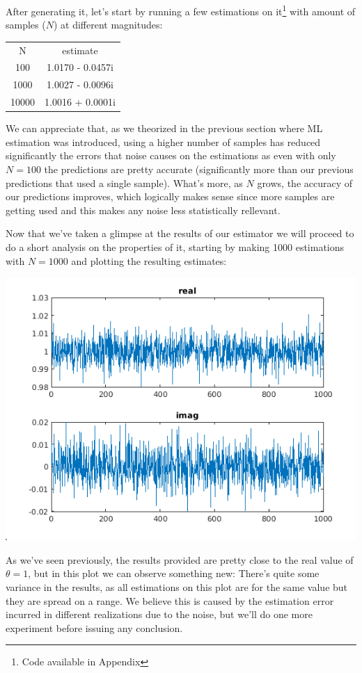 \documentclass[conference,9pt]{IEEEtran}
\begin{document}
After generating it, let's start by running a few estimations on it\footnote{Code available in Appendix} with amount of samples ($N$) at different magnitudes:

\begin{center}
    \begin{tabular}{ c c }
    N & estimate  \\ 
    100 & 1.0170 - 0.0457i  \\  
    1000 & 1.0027 - 0.0096i  \\  
    10000 & 1.0016 + 0.0001i
    \end{tabular}
\end{center}

We can appreciate that, as we theorized in the previous section where ML estimation was introduced, using a higher number of samples has reduced significantly the errors that noise causes on the estimations as even with only $N=100$ the predictions are pretty accurate (significantly more than our previous predictions that used a single sample). What's more, as $N$ grows, the accuracy of our predictions improves, which logically makes sense since more samples are getting used and this makes any noise less statistically rellevant.

Now that we've taken a glimpse at the results of our estimator we will proceed to do a short analysis on the properties of it, starting by making 1000 estimations with $N=1000$ and plotting the resulting estimates:

\includegraphics[scale=0.6]{b5}

As we've seen previously, the results provided are pretty close to the real value of $\theta = 1$, but in this plot we can observe something new: There's quite some variance in the results, as all estimations on this plot are for the same value but they are spread on a range. We believe this is caused by the estimation error incurred in different realizations due to the noise, but we'll do one more experiment before issuing any conclusion.
\end{document}
